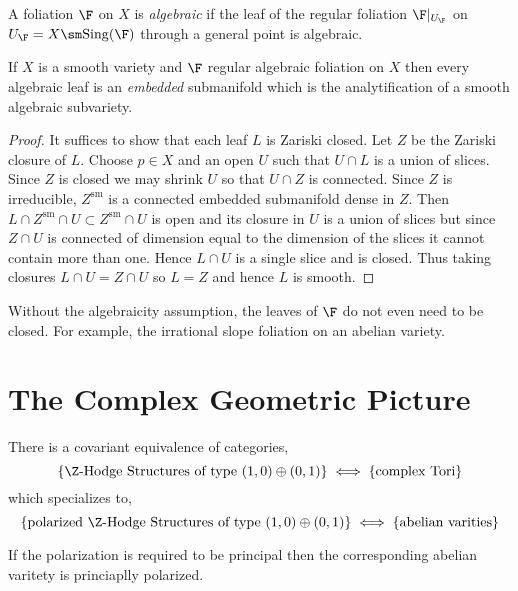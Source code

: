 \documentclass[12pt]{article}
\begin{document}
\begin{defn}
A foliation $\F$ on $X$ is \textit{algebraic} if the leaf of the regular foliation $\F|_{U_{\F}}$ on $U_{\F} = X \sm \Sing(\F)$ through a general point is algebraic.
\end{defn}

\begin{prop}
If $X$ is a smooth variety and $\F$ regular algebraic foliation on $X$ then every algebraic leaf is an \textit{embedded} submanifold which is the analytification of a smooth algebraic subvariety.
\end{prop}

\begin{proof}
It suffices to show that each leaf $L$ is Zariski closed. Let $Z$ be the Zariski closure of $L$. Choose $p \in X$ and an open $U$ such that $U \cap L$ is a union of slices. Since $Z$ is closed we may shrink $U$ so that $U \cap Z$ is connected. Since $Z$ is irreducible, $Z^{\text{sm}}$ is a connected embedded submanifold dense in $Z$. Then $L \cap Z^{\text{sm}} \cap U \subset Z^{\text{sm}} \cap U$ is open and its closure in $U$ is a union of slices but since $Z \cap U$ is connected of dimension equal to the dimension of the slices it cannot contain more than one. Hence $L \cap U$ is a single slice and is closed. Thus taking closures $L \cap U = Z \cap U$ so $L = Z$ and hence $L$ is smooth.
\end{proof}

\begin{rmk}
Without the algebraicity assumption, the leaves of $\F$ do not even need to be closed. For example, the irrational slope foliation on an abelian variety. 
\end{rmk}

\section{The Complex Geometric Picture}

\begin{prop}
There is a covariant equivalence of categories,
\[ \{ \Z\text{-Hodge Structures of type } (1,0) \oplus (0,1) \} \iff \{ \text{complex Tori} \} \]
which specializes to,
\[ \{ \text{polarized } \Z\text{-Hodge Structures of type } (1,0) \oplus (0,1) \} \iff \{ \text{abelian varities} \} \] 
\end{prop}

\begin{rmk}
If the polarization is required to be principal then the corresponding abelian varitety is princiaplly polarized. 
\end{rmk}
\end{document}
